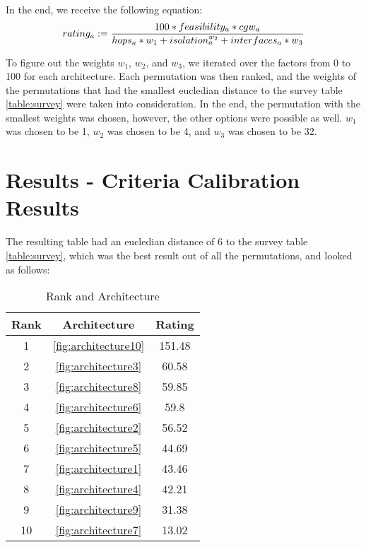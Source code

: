 In the end, we receive the following equation:\\
\begin{equation}
    rating_{a} := \frac{100 * feasibility_{a} * cgw_{a}}{hops_{a}*w_{1} + isolation_{a}^{w_{2}} + interfaces_{a}*w_{3}} \label{eq:rating}\\\\
\end{equation}

\hfill \break

To figure out the weights $w_{1}$, $w_{2}$, and $w_{3}$, we iterated over the factors from 0 to 100 for each architecture.
Each permutation was then ranked, and the weights of the permutations that had the smallest eucledian distance to the survey table \ref{table:survey} were taken into consideration.
In the end, the permutation with the smallest weights was chosen, however, the other options were possible as well.
$w_{1}$ was chosen to be 1, $w_{2}$ was chosen to be 4, and $w_{3}$ was chosen to be 32.\\

\section{Results - Criteria Calibration Results}
\label{sec:calibration}

The resulting table had an eucledian distance of 6 to the survey table \ref{table:survey}, which was the best result out of all the permutations, and looked as follows:\\

\begin{table}[h]
    \label{table:testcriteriaresults}
    \centering
    \caption{Rank and Architecture}
    \begin{tabular}{ |c|c|c| } 
    \hline
    Rank & Architecture & Rating\\
    \hline
    1 & \ref{fig:architecture10} & 151.48\\
    2 & \ref{fig:architecture3} & 60.58\\
    3 & \ref{fig:architecture8} & 59.85\\
    4 & \ref{fig:architecture6} & 59.8\\
    5 & \ref{fig:architecture2} & 56.52\\
    6 & \ref{fig:architecture5} & 44.69\\
    7 & \ref{fig:architecture1} & 43.46\\
    8 & \ref{fig:architecture4} & 42.21\\
    9 & \ref{fig:architecture9} & 31.38\\
    10 & \ref{fig:architecture7} & 13.02\\
    \hline
    \end{tabular}
\end{table}

